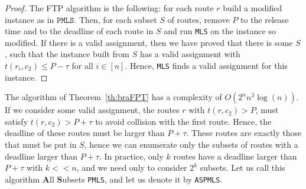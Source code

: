 \documentclass[a4paper,10pt]{article}
\newcommand\MLS{\texttt{MLS}\xspace}
\newcommand\PMLS{\texttt{PMLS}\xspace}
\newcommand\ASPMLS{\texttt{ASPMLS}\xspace}
\begin{document}
\begin{proof}
The FTP algorithm is the following: for each route $r$ build a modified instance as in $\PMLS$.
Then, for each subset $S$ of routes, remove $P$ to the release time and to the deadline of each route in $S$ and run \MLS on the instance so modified. If there is a valid assignment, then we have proved that there is some $S$, such that the instance built from $S$ has a valid assignment with $t(r_i,c_2) \leq P - \tau$ for all $i\in [n]$. Hence, \MLS finds a valid assignment for this instance.
\end{proof}

The algorithm of Theorem~\ref{th:braFPT} has a complexity of $O(2^nn^3\log(n))$. If we consider some valid assignment, the routes $r$ with $t(r,c_2) > P$, must satisfy $t(r,c_2) > P + \tau$ to avoid collision with the first route. Hence, the deadline of these routes must be larger than $P + \tau$. These routes are exactly those that must be put in $S$, hence we can enumerate only the subsets of routes with a deadline larger than $P + \tau$. In practice, only $k$ routes have a deadline larger than $P + \tau$ with $k << n$, and we need only to consider $2^k$ subsets. Let us call this algorithm \textbf{A}ll \textbf{S}ubsets \PMLS, and let us denote it by \ASPMLS.
\end{document}
